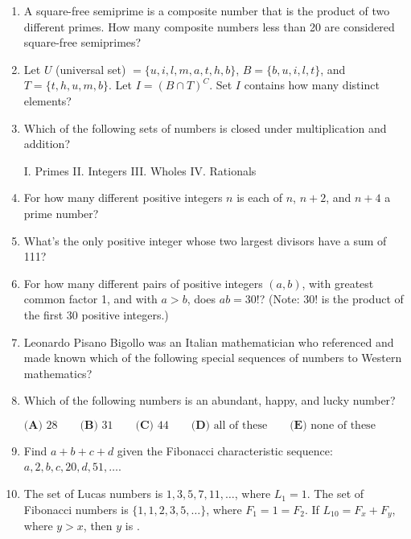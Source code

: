 \documentclass[../uilmath.tex]{subfiles}
\begin{document}
\begin{enumerate}[label=\bfseries\arabic*.]
    \item %
    A square-free semiprime is a composite number that is the product of two different primes. How many composite numbers less than 20 are considered square-free semiprimes?

    \item %
    Let $U$ (universal set) $= \{u,i,l,m,a,t,h,b\}$, $B=\{b,u,i,l,t\}$, and $T=\{t,h,u,m,b\}$. Let $I=(B \cap T)^C$. Set $I$ contains how many distinct elements?

    \item %
    Which of the following sets of numbers is closed under multiplication and addition?

    I. Primes \qquad II. Integers \qquad III. Wholes \qquad IV. Rationals 

    \item %
    For how many different positive integers $n$ is each of $n$, $n+2$, and $n+4$ a prime number?

    \item %
    What's the only positive integer whose two largest divisors have a sum of 111?

    \item %
    For how many different pairs of positive integers $(a,b)$, with greatest common factor 1, and with $a>b$, does $ab=30!$? (Note: $30!$ is the product of the first 30 positive integers.)

    \item %
    Leonardo Pisano Bigollo was an Italian mathematician who referenced and made known which of the following special sequences of numbers to Western mathematics?

    \item %
    Which of the following numbers is an abundant, happy, and lucky number?

    $\textbf{(A) } 28 \qquad \textbf{(B) } 31 \qquad \textbf{(C) } 44 \qquad \textbf{(D) }\text{all of these} \qquad \textbf{(E) } \text{none of these}$

    \item %
    Find $a+b+c+d$ given the Fibonacci characteristic sequence: $a,2,b,c,20,d,51,\dots$.

    \item %
    The set of Lucas numbers is ${1,3,5,7,11,\dots}$, where $L_1 = 1$. The set of Fibonacci numbers is $\{1,1,2,3,5,\dots\}$, where $F_1=1=F_2$.
    If $L_{10}=F_x+F_y$, where $y>x$, then $y$ is \blank .


\end{enumerate}
\end{document}
